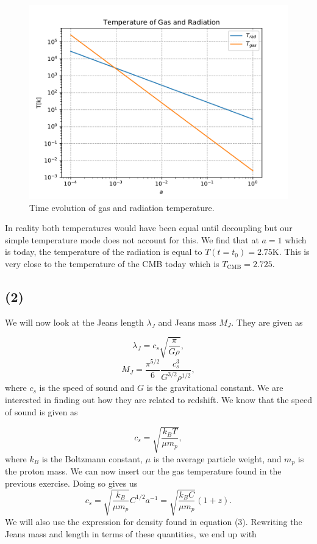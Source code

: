 \documentclass[a4paper]{article}
\begin{document}
\begin{figure}[h]
  \centering
  \includegraphics[width=0.9\linewidth]{Temp.pdf}
  \caption{Time evolution of gas and radiation temperature.}
  \label{fig:3}
\end{figure}

In reality both temperatures would have been equal until decoupling but our simple temperature mode does not account for this. We find that at $a = 1$ which is today, the temperature of the radiation is equal to $T(t=t_0) = 2.75$K. This is very close to the temperature of the CMB today which is $T_\text{CMB} = 2.725$. 

\subsection*{(2)}

We will now look at the Jeans length $\lambda_J$ and Jeans mass $M_J$. They are given as

\begin{equation}
    \lambda_J = c_s \sqrt{\frac{\pi}{G \rho}},
\end{equation}
\begin{equation}
    M_J = \frac{\pi^{5/2}}{6} \frac{c_s^3}{G^{3/2}\rho^{1/2}},
\end{equation}
where $c_s$ is the speed of sound and $G$ is the gravitational constant.
We are interested in finding out how they are related to redshift. We know that the speed of sound is given as

\begin{equation}
    c_s = \sqrt{\frac{k_B T}{\mu m_p}},
\end{equation}
where $k_B$ is the Boltzmann constant, $\mu$ is the average particle weight, and $m_p$ is the proton mass. We can now insert our the gas temperature found in the previous exercise. Doing so gives us
\begin{equation}
    c_s = \sqrt{\frac{k_B}{\mu m_p}} C^{1/2}a^{-1} = \sqrt{\frac{k_B C}{\mu m_p}}(1+z).
\end{equation}
We will also use the expression for density found in equation (3). Rewriting the Jeans mass and length in terms of these quantities, we end up with 
\end{document}
